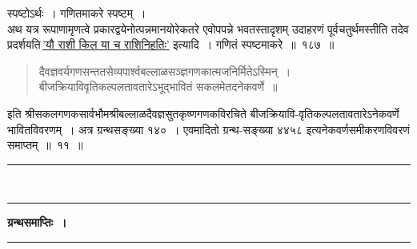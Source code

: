 \documentclass[11pt, openany]{book}
\begin{document}
\newpage

\begin{sloppypar}
स्पष्टोऽर्थः~। गणितमाकरे स्पष्टम्~। \\

अथ यत्र रूपाणामृणत्वे प्रकारद्वयेनोत्पन्नमानयोरेकतरे एवोपपन्ने भवतस्तादृशम् उदाहरणं पूर्वचतुर्थमस्तीति तदेव प्रदर्शयति\textendash \,\hyperref[11.184]{'यौ राशी किल या च राशिनिहतिः'} इत्यादि~। गणितं स्पष्टमाकरे~॥~१८७~॥ 

\begin{quote}
{\color{violet}दैवज्ञवर्यगणसन्ततसेव्यपार्श्वबल्लाळसञ्ज्ञगणकात्मजनिर्मितेऽस्मिन्~। \\
बीजक्रियाविवृतिकल्पलतावतारेऽभूद्भावितं सकलमेतदनेकवर्णे~॥ }
\end{quote}

इति श्रीसकलगणकसार्वभौमश्रीबल्लाळदैवज्ञसुतकृष्णगणकविरचिते बीजक्रियावि-वृतिकल्पलतावतारेऽनेकवर्णे भावितविवरणम्~। अत्र ग्रन्थसङ्ख्या १४०~। एवमादितो ग्रन्थ-सङ्ख्या ४४५८ इत्यनेकवर्णसमीकरणविवरणं समाप्तम्~॥~११~॥

\begin{center}
\rule{0.2\linewidth}{0.8pt}\\
\vspace{-4mm}

\rule{0.2\linewidth}{0.8pt}
\end{center}
\end{sloppypar}

\newpage
\thispagestyle{empty}

\begin{center}
\textbf{\large ग्रन्थसमाप्तिः~।}\\
\rule{0.2\linewidth}{0.8pt}
\end{center}
\end{document}

